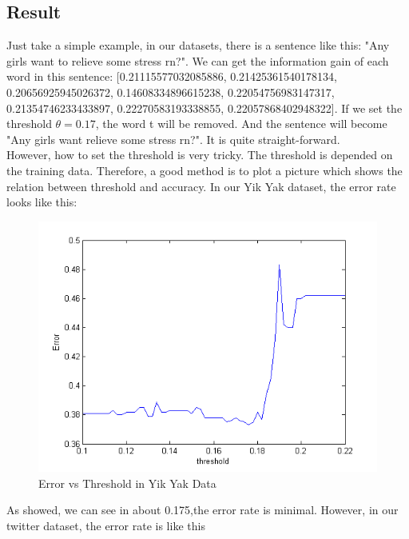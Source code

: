 \documentclass{article}
\begin{document}
  \subsection{Result}
  Just take a simple example, in our datasets, there is a sentence like this: "Any girls want to relieve some stress rn?". We can get the information gain of each word in this sentence: 
  [0.21115577032085886, 0.21425361540178134, 0.20656925945026372, 0.14608334896615238, 0.22054756983147317, 0.21354746233433897, 0.22270583193338855, 0.22057868402948322].
  If we set the threshold $\theta=0.17$, the word t will be removed. And the sentence will become "Any girls want relieve some stress rn?". It is quite straight-forward. \\ 
     However, how to set the threshold is very tricky. The threshold is depended on the training data. Therefore, a good method is to plot a picture which shows the relation between threshold and accuracy. In our Yik Yak dataset, the error rate looks like this:
     \begin{figure}
     \centering
     \includegraphics[width=1\textwidth]{evt.png}
     \caption{Error vs Threshold in Yik Yak Data}
     \end{figure}
     As showed, we can see in about 0.175,the error rate is minimal. However, in our twitter dataset, the error rate is like this
\end{document}
